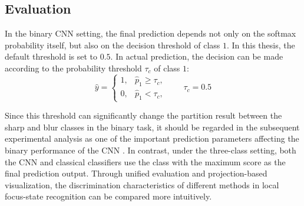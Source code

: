 \subsection{Evaluation}
\par In the binary CNN setting, the final prediction depends not only on the
softmax probability itself, but also on the decision threshold of class $1$. In
this thesis, the default threshold is set to $0.5$. In actual prediction, the
decision can be made according to the probability threshold $\tau_c$ of class
$1$:
\begin{equation}
    \hat{y}=
    \begin{cases}
        1, & \hat{p}_1\ge \tau_c, \\
        0, & \hat{p}_1<\tau_c,
    \end{cases}
    \qquad \tau_c=0.5
    \label{eq:cnn-binary-threshold}
\end{equation}
\par Since this threshold can significantly change the partition result between
the sharp and blur classes in the binary task, it should be regarded in the
subsequent experimental analysis as one of the important prediction parameters
affecting the binary performance of the CNN \cite{davis2006relationship}. In
contrast, under the three-class setting, both the CNN and classical classifiers
use the class with the maximum score as the final prediction output. Through
unified evaluation and projection-based visualization, the discrimination
characteristics of different methods in local focus-state recognition can be
compared more intuitively.

